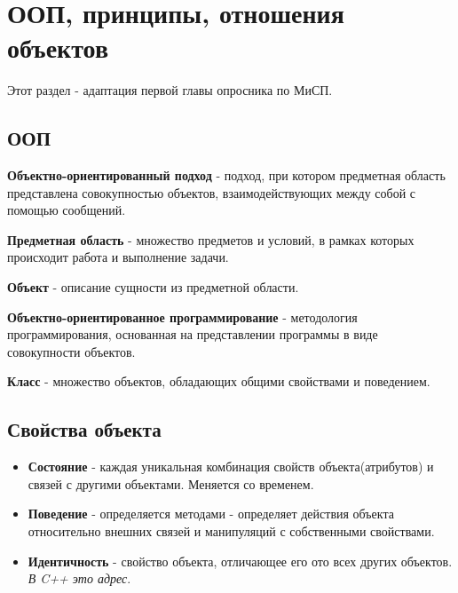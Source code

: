 \section{ООП, принципы, отношения объектов}
\begin{notice}
Этот раздел - адаптация первой главы опросника по МиСП.
\end{notice}
\subsection{ООП}

    \begin{definition}
    \textbf{Объектно-ориентированный подход} - подход, при котором предметная область представлена совокупностью объектов, взаимодействующих между собой с помощью сообщений.
    \end{definition}
    
    \begin{definition}
    \textbf{Предметная область} - множество предметов и условий, в рамках которых происходит работа и выполнение задачи.
    \end{definition}
    \begin{definition}
    \textbf{Объект} - описание сущности из предметной области.
    \end{definition}
    \begin{definition}
    \textbf{Объектно-ориентированное программирование} - методология программирования, основанная на представлении программы в виде совокупности объектов.
    \end{definition}
    \begin{definition}
    \textbf{Класс} - множество объектов, обладающих общими свойствами и поведением.
    \end{definition}

\subsection{Свойства объекта}
    \begin{itemize}
        
        \item \begin{definition}\textbf{Состояние} - каждая уникальная комбинация свойств объекта(атрибутов) и связей с другими объектами. Меняется со временем.
        \end{definition}
        
        \item \begin{definition}\textbf{Поведение} - определяется методами - определяет действия объекта относительно внешних связей и манипуляций с собственными свойствами.
        \end{definition}
        
        \item \begin{definition}\textbf{Идентичность} - свойство объекта, отличающее его ото всех других объектов. \textit{В C++ это адрес}.
        \end{definition}
    \end{itemize}
    
